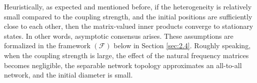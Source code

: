 \documentclass[11pt,reqno]{amsart}
\numberwithin{figure}{section}
\newcommand{\St}{  {\textup{St}}(p,n) }
\begin{document}




Heuristically, as expected and mentioned before, if the heterogeneity is relatively small compared to the coupling strength, and the initial positions are sufficiently close to each other, then the matrix-valued inner products converge to stationary states. In other words, asymptotic consensus arises. These assumptions are formalized in the framework $(\mathcal{F})$ below in Section \ref{sec:2.4}. Roughly speaking, when the coupling strength is large, the effect of the natural frequency matrices becomes negligible, the separable network topology approximates an all-to-all network, and the initial diameter is small. 
\end{document}
